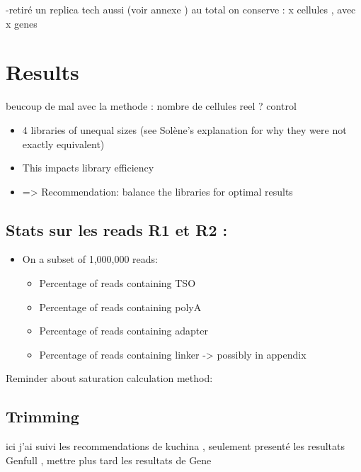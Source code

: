 \documentclass[
  11pt,
  a4paper,
]{report}
\providecommand{\tightlist}{%
  \setlength{\itemsep}{0pt}\setlength{\parskip}{0pt}}\usepackage{longtable,booktabs,array}
\begin{document}
-retiré un replica tech aussi (voir annexe ) au total on conserve : x
cellules , avec x genes


\chapter{Results}\label{results}

beucoup de mal avec la methode : nombre de cellules reel ? control

\begin{itemize}
\tightlist
\item
  4 libraries of unequal sizes (see Solène's explanation for why they
  were not exactly equivalent)
\item
  This impacts library efficiency
\item
  =\textgreater{} Recommendation: balance the libraries for optimal
  results
\end{itemize}

\section{Stats sur les reads R1 et R2
:}\label{stats-sur-les-reads-r1-et-r2}

\begin{itemize}
\tightlist
\item
  On a subset of 1,000,000 reads:

  \begin{itemize}
  \tightlist
  \item
    Percentage of reads containing TSO
  \item
    Percentage of reads containing polyA
  \item
    Percentage of reads containing adapter
  \item
    Percentage of reads containing linker -\textgreater{} possibly in
    appendix
  \end{itemize}
\end{itemize}

Reminder about saturation calculation method:

\section{Trimming}\label{trimming}

ici j'ai suivi les recommendations de kuchina , seulement presenté les
resultats Genfull , mettre plus tard les resultats de Gene
\end{document}
